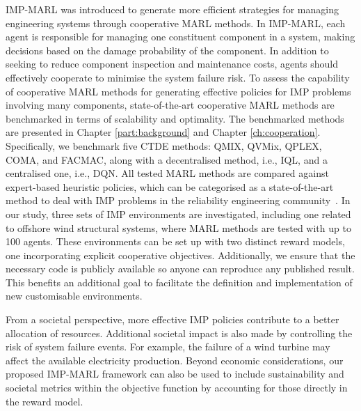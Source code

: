 IMP-MARL was introduced to generate more efficient strategies for managing engineering systems through cooperative MARL methods.
In IMP-MARL, each agent is responsible for managing one constituent component in a system, making decisions based on the damage probability of the component.
In addition to seeking to reduce component inspection and maintenance costs, agents should effectively cooperate to minimise the system failure risk.
To assess the capability of cooperative MARL methods for generating effective policies for IMP problems involving many components, state-of-the-art cooperative MARL methods are benchmarked in terms of scalability and optimality.
The benchmarked methods are presented in Chapter \ref{part:background} and Chapter \ref{ch:cooperation}.
Specifically, we benchmark five CTDE methods: QMIX, QVMix, QPLEX, COMA, and FACMAC, along with a decentralised method, i.e., IQL, and a centralised one, i.e., DQN.
All tested MARL methods are compared against expert-based heuristic policies, which can be categorised as a state-of-the-art method to deal with IMP problems in the reliability engineering community~\citep{LuqueDBN2019, morato2022optimal}.
In our study, three sets of IMP environments are investigated, including one related to offshore wind structural systems, where MARL methods are tested with up to 100 agents.
These environments can be set up with two distinct reward models, one incorporating explicit cooperative objectives.
Additionally, we ensure that the necessary code is publicly available so anyone can reproduce any published result.
This benefits an additional goal to facilitate the definition and implementation of new customisable environments.

From a societal perspective, more effective IMP policies contribute to a better allocation of resources.
Additional societal impact is also made by controlling the risk of system failure events.
For example, the failure of a wind turbine may affect the available electricity production. 
Beyond economic considerations, our proposed IMP-MARL framework can also be used to include sustainability and societal metrics within the objective function by accounting for those directly in the reward model.

